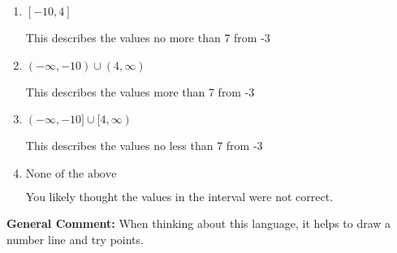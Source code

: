 \documentclass{extbook}[14pt]
\begin{document}
\begin{enumerate}
{\begin{enumerate}[label=\Alph*.]
This describes the values less than 7 from -3
\item \( [-10, 4] \)

This describes the values no more than 7 from -3
\item \( (-\infty, -10) \cup (4, \infty) \)

This describes the values more than 7 from -3
\item \( (-\infty, -10] \cup [4, \infty) \)

This describes the values no less than 7 from -3
\item \( \text{None of the above} \)

You likely thought the values in the interval were not correct.
\end{enumerate}

\textbf{General Comment:} When thinking about this language, it helps to draw a number line and try points.
}
\end{enumerate}
\end{document}
